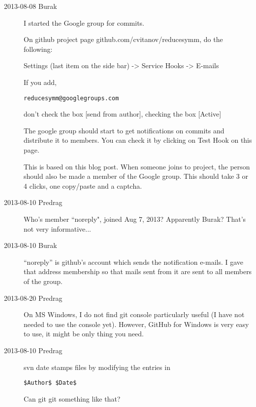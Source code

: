 \begin{description}
\item[2013-08-08 Burak]
I started the
 {Google group} for  commits.

On github project page
{github.com/cvitanov/reducesymm}, do the following:

Settings (last item on the side bar) -> Service Hooks -> E-mails

If you add,

\texttt{reducesymm@googlegroups.com}

don't check the box [send from author], checking the box [Active]

The google group should start to get notifications on commits and
distribute it to members.  You can check it by clicking on Test Hook on
this page.

This is based on
{this blog post}.
When someone joins
to project, the person should also be made a member of the
 {Google group}.
This should take 3 or 4 clicks, one copy/paste and a captcha.

\item[2013-08-10 Predrag]
Who's member ``noreply", joined Aug 7, 2013? Apparently Burak? That's not very informative...

\item[2013-08-10 Burak]
``noreply'' is github's account which sends the notification e-mails. I gave that address membership so that mails sent from it are sent
to all members of the group.

\item[2013-08-20 Predrag] On MS Windows, I do not find
 {git console} particularly useful (I have
not needed to use the console yet). However,
 {GitHub for Windows} is very easy
to use, it might be only thing you need.



\item[2013-08-10 Predrag] svn date stamps files by modifying the entries in
\begin{verbatim}
$Author$ $Date$
\end{verbatim}
Can git git something like that?

\end{description}
